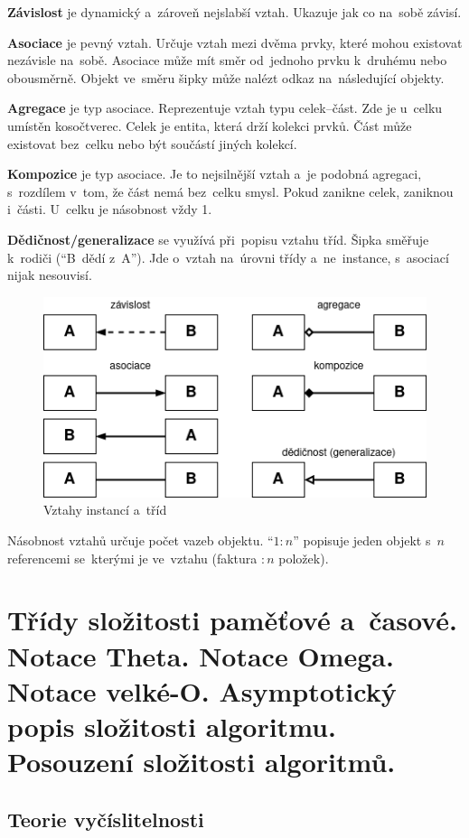 \textbf{Závislost} je dynamický a~zároveň nejslabší vztah. Ukazuje jak co na~sobě závisí.

\textbf{Asociace} je pevný vztah. Určuje vztah mezi dvěma prvky, které mohou existovat nezávisle na~sobě. Asociace může mít směr od~jednoho prvku k~druhému nebo obousměrně. Objekt ve~směru šipky může nalézt odkaz na~následující objekty.

\textbf{Agregace} je typ asociace. Reprezentuje vztah typu celek--část. Zde je u~celku umístěn kosočtverec. Celek je entita, která drží kolekci prvků. Část může existovat bez~celku nebo být součástí jiných kolekcí.

\textbf{Kompozice} je typ asociace. Je to nejsilnější vztah a~je podobná agregaci, s~rozdílem v~tom, že část nemá bez~celku smysl. Pokud zanikne celek, zaniknou i~části. U~celku je násobnost vždy 1.

\textbf{Dědičnost/generalizace} se využívá při~popisu vztahu tříd. Šipka směřuje k~rodiči (\enquote{B~dědí z~A}). Jde o~vztah na~úrovni třídy a~ne~instance, s~asociací nijak nesouvisí.

\begin{figure}[ht]
	\centering
	\includegraphics[scale=0.8]{images/vztahy-trid}
	\caption{Vztahy instancí a~tříd}
\end{figure}

Násobnost vztahů určuje počet vazeb objektu. \enquote{$1:n$} popisuje jeden objekt s~$n$ referencemi se~kterými je ve~vztahu (faktura $:n$ položek).

\clearpage
\section{Třídy složitosti paměťové a~časové. Notace Theta. Notace Omega. Notace velké-O. Asymptotický popis složitosti algoritmu. Posouzení složitosti algoritmů.}

\subsection{Teorie vyčíslitelnosti}

